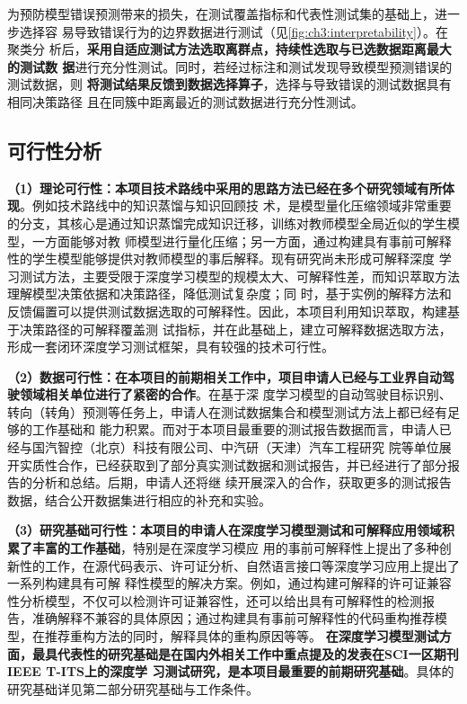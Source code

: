 为预防模型错误预测带来的损失，在测试覆盖指标和代表性测试集的基础上，进一步选择容
易导致错误行为的边界数据进行测试（见\cref{fig:ch3:interpretability}）。在聚类分
析后，\textbf{采用自适应测试方法选取离群点，持续性选取与已选数据距离最大的测试数
    据}进行充分性测试。同时，若经过标注和测试发现导致模型预测错误的测试数据，则
\textbf{将测试结果反馈到数据选择算子}，选择与导致错误的测试数据具有相同决策路径
且在同簇中距离最近的测试数据进行充分性测试。

\subsection{可行性分析}

\textbf{（1）理论可行性：本项目技术路线中采用的思路方法已经在多个研究领域有所体现}。例如技术路线中的知识蒸馏与知识回顾技
术，是模型量化压缩领域非常重要的分支，其核心是通过知识蒸馏完成知识迁移，训练对教师模型全局近似的学生模型，一方面能够对教
师模型进行量化压缩；另一方面，通过构建具有事前可解释性的学生模型能够提供对教师模型的事后解释。现有研究尚未形成可解释深度
学习测试方法，主要受限于深度学习模型的规模太大、可解释性差，而知识萃取方法理解模型决策依据和决策路径，降低测试复杂度；同
时，基于实例的解释方法和反馈偏置可以提供测试数据选取的可解释性。因此，本项目利用知识萃取，构建基于决策路径的可解释覆盖测
试指标，并在此基础上，建立可解释数据选取方法，形成一套闭环深度学习测试框架，具有较强的技术可行性。


\textbf{（2）数据可行性：在本项目的前期相关工作中，项目申请人已经与工业界自动驾驶领域相关单位进行了紧密的合作}。在基于深
度学习模型的自动驾驶目标识别、转向（转角）预测等任务上，申请人在测试数据集合和模型测试方法上都已经有足够的工作基础和
能力积累。而对于本项目最重要的测试报告数据而言，申请人已经与国汽智控（北京）科技有限公司、中汽研（天津）汽车工程研究
院等单位展开实质性合作，已经获取到了部分真实测试数据和测试报告，并已经进行了部分报告的分析和总结。后期，申请人还将继
续开展深入的合作，获取更多的测试报告数据，结合公开数据集进行相应的补充和实验。

\textbf{（3）研究基础可行性：本项目的申请人在深度学习模型测试和可解释应用领域积累了丰富的工作基础}，特别是在深度学习模应
用的事前可解释性上提出了多种创新性的工作，在源代码表示、许可证分析、自然语言接口等深度学习应用上提出了一系列构建具有可解
释性模型的解决方案。例如，通过构建可解释的许可证兼容性分析模型，不仅可以检测许可证兼容性，还可以给出具有可解释性的检测报
告，准确解释不兼容的具体原因；通过构建具有事前可解释性的代码重构推荐模型，在推荐重构方法的同时，解释具体的重构原因等等。
\textbf{在深度学习模型测试方面，最具代表性的研究基础是在国内外相关工作中重点提及的发表在SCI一区期刊IEEE T-ITS上的深度学
    习测试研究，是本项目最重要的前期研究基础}。具体的研究基础详见第二部分研究基础与工作条件。

\iffalse
    \subsubsection{团队合理性}

   
\fi